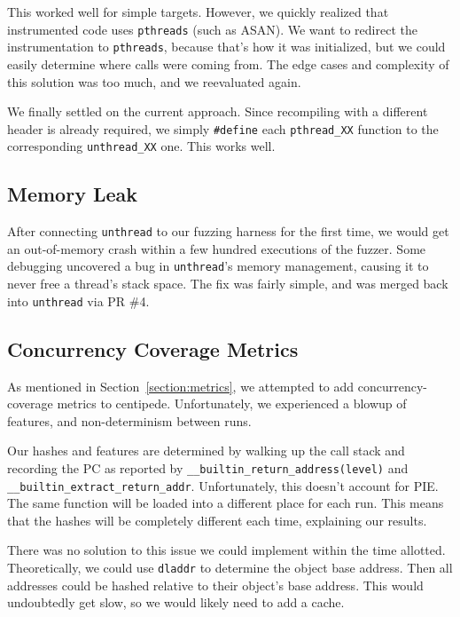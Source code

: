 \documentclass{article}
\begin{document}
This worked well for simple targets. However, we quickly realized that instrumented code uses \texttt{pthreads} (such as ASAN). We want to redirect the instrumentation to \texttt{pthreads}, because that's how it was initialized, but we could easily determine where calls were coming from. The edge cases and complexity of this solution was too much, and we reevaluated again.

We finally settled on the current approach. Since recompiling with a different header is already required, we simply \texttt{\#define} each \texttt{pthread\_XX} function to the corresponding \texttt{unthread\_XX} one. This works well.

\subsection{Memory Leak}

After connecting \texttt{unthread} to our fuzzing harness for the first time, we would get an out-of-memory crash within a few hundred executions of the fuzzer. Some debugging uncovered a bug in \texttt{unthread}'s memory management, causing it to never free a thread's stack space. The fix was fairly simple, and was merged back into \texttt{unthread} via PR \#4\cite{unthread_pr}.

\subsection{Concurrency Coverage Metrics}\label{section:metrics-challenges}

As mentioned in Section~\ref{section:metrics}, we attempted to add concurrency-coverage metrics to centipede. Unfortunately, we experienced a blowup of features, and non-determinism between runs. 

\sloppy 

Our hashes and features are determined by walking up the call stack and recording the PC as reported by \texttt{\_\_builtin\_return\_address(level)} and \texttt{\_\_builtin\_extract\_return\_addr}. Unfortunately, this doesn't account for PIE. The same function will be loaded into a different place for each run. This means that the hashes will be completely different each time, explaining our results.

\fussy

There was no solution to this issue we could implement within the time allotted. Theoretically, we could use \texttt{dladdr} to determine the object base address. Then all addresses could be hashed relative to their object's base address. This would undoubtedly get slow, so we would likely need to add a cache.
\end{document}
